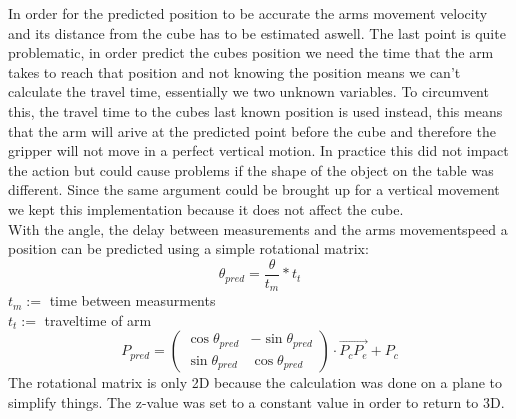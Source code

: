 \documentclass[report]{iisthesis}
\begin{document}
In order for the predicted position to be accurate the arms movement velocity and its distance from the cube has to be estimated aswell.
The last point is quite problematic, in order predict the cubes position we need the time that the arm takes to reach that position and not knowing the position means we can't calculate the travel time, 
essentially we two unknown variables.
To circumvent this, the travel time to the cubes last known position is used instead, this means that the arm will arive at the predicted point before the cube 
and therefore the gripper will not move in a perfect vertical motion. In practice this did not impact the action but could cause problems if the shape of the object on the table was different.
Since the same argument could be brought up for a vertical movement we kept this implementation because it does not affect the cube. \\
With the angle, the delay between measurements and the arms movementspeed a position can be predicted using a simple rotational matrix:
$$
\theta_{pred} = \frac{\theta}{t_m} * t_t
$$
$t_m :=$ time between measurments \\
$t_t :=$ traveltime of arm 
$$
P_{pred} =
\begin{pmatrix}
    \cos\theta_{pred} & -\sin\theta_{pred} \\
    \sin\theta_{pred} & \cos\theta_{pred}
\end{pmatrix}
\cdot \overrightarrow{P_cP_e}
+ P_c
$$
The rotational matrix is only 2D because the calculation was done on a plane to simplify things. The z-value was set to a constant value in order to return to 3D. 
\end{document}
